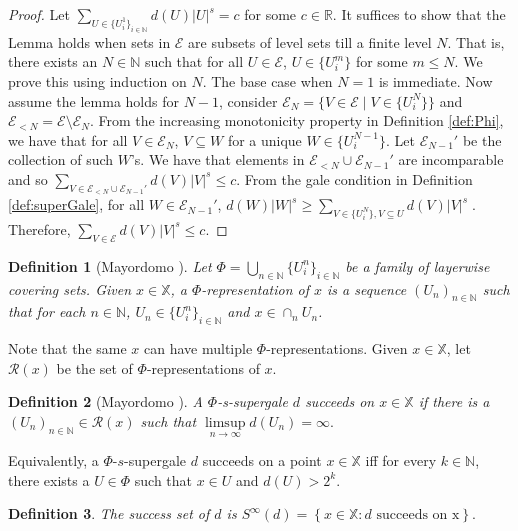 \documentclass[11pt]{article}
\newtheorem{definition}{Definition}
\newcommand{\N}{\mathbb{N}}
\newcommand{\R}{\mathbb{R}}
\newcommand{\X}{{\mathbb{X}}}
\newcommand{\U}{U}
\newcommand{\defPhi}{\bigcup_{n \in \N}\{U_i^n\}_{i \in
		\N}}
\newcommand{\x}{x}
\begin{document}
\begin{proof}
	
	Let $\sum\limits_{U \in \{U_i^1\}_{i \in \N}} d(U) |U|^s = c$ for some $c \in \R$. It suffices to show that the Lemma holds when sets in $\mathcal{E}$ are subsets of level sets till a finite level $N$. That is, there exists an $N \in \N$ such that for all $U \in \mathcal{E}$, $U \in \{U_i^m\}$ for some $m \leq N$.  We prove this using induction on $N$. The base case when $N = 1$ is immediate. Now assume the lemma holds for $N-1$, consider $\mathcal{E}_N = \{V \in \mathcal{E} \;\vert\; V \in \{U_i^N\}\}$ and $\mathcal{E}_{<N} = \mathcal{E} \setminus \mathcal{E}_N$. From the increasing monotonicity property in Definition \ref{def:Phi}, we have that for all $V \in \mathcal{E}_N$, $V \subseteq W$ for a unique $W \in \{U_i^{N-1}\}$. Let $\mathcal{E}_{N-1}'$ be the collection of such $W$'s. We have that elements in $\mathcal{E}_{<N} \cup \mathcal{E}_{N-1}'$ are incomparable and so $\sum\limits_{V \in \mathcal{E}_{<N} \cup \mathcal{E}_{N-1}'} d(V) |V|^s \leq c$. From the gale condition in Definition \ref{def:superGale},  for all $W \in \mathcal{E}_{N-1}'$, 
	$ d(W)  |W|^s \geq \sum_{V \in  \{\U_i^{N}\}, V \subseteq U}  d(V) |V|^s\;$. Therefore, $\sum\limits_{V \in \mathcal{E}} d(V) |V|^s \leq c$.		
\end{proof}

\begin{definition} [Mayordomo \cite{Mayordomo2018}] 	Let $\Phi = \defPhi$ be a family of layerwise covering sets.
	Given $\x \in \X$, a $\Phi$-representation of $\x$ is a sequence $(U_n)_{n \in \N}$ such that for each $n \in \N$, $U_n \in \{U_i^n\}_{i \in \N}$ and $\x \in \cap_n U_n$.
\end{definition}


Note that the same $\x$ can have multiple $\Phi$-representations. Given $\x \in \X$, let $\mathcal{R}(\x)$ be the set of $\Phi$-representations of $\x$.

\begin{definition} [Mayordomo \cite{Mayordomo2018}]
	A $\Phi$-s-supergale $d$ succeeds on $\x \in \X$ if there is a $(U_n)_{n \in \N} \in \mathcal{R}(\x)$ such that 
	$\limsup \limits_{n \rightarrow \infty} d(U_n) =\infty.$
\end{definition}

Equivalently, a $\Phi$-$s$-supergale $d$ succeeds on a point $\x \in \X$ iff for every $k \in \N$, there exists a $U \in \Phi$ such that $\x \in \U$ and $d(U) > 2^k$. 

\begin{definition} 
	The \emph{success set} of $d$ is $S^\infty (d) = \left\{ \x \in \X : d \text{ succeeds on \x} \right\}.$\end{definition}
\end{document}
